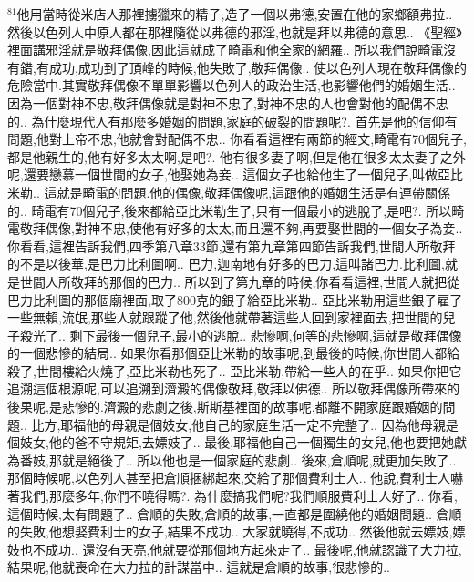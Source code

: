 \documentclass{book}
\begin{document}
$^{81}$他用當時從米店人那裡擄獵來的精子,造了一個以弗德,安置在他的家鄉額弗拉..
然後以色列人中原人都在那裡隨從以弗德的邪淫,也就是拜以弗德的意思..
《聖經》裡面講邪淫就是敬拜偶像,因此這就成了畸電和他全家的網羅..
所以我們說畸電沒有錯,有成功,成功到了頂峰的時候,他失敗了,敬拜偶像..
使以色列人現在敬拜偶像的危險當中.其實敬拜偶像不單單影響以色列人的政治生活,也影響他們的婚姻生活..
因為一個對神不忠,敬拜偶像就是對神不忠了,對神不忠的人也會對他的配偶不忠的..
為什麼現代人有那麼多婚姻的問題,家庭的破裂的問題呢?.
首先是他的信仰有問題,他對上帝不忠,他就會對配偶不忠..
你看看這裡有兩節的經文,畸電有70個兒子,都是他親生的,他有好多太太啊,是吧?.
他有很多妻子啊,但是他在很多太太妻子之外呢,還要戀慕一個世間的女子,他娶她為妾..
這個女子也給他生了一個兒子,叫做亞比米勒..
這就是畸電的問題.他的偶像,敬拜偶像呢,這跟他的婚姻生活是有連帶關係的..
畸電有70個兒子,後來都給亞比米勒生了,只有一個最小的逃脫了,是吧?.
所以畸電敬拜偶像,對神不忠,使他有好多的太太,而且還不夠,再要娶世間的一個女子為妾..
你看看,這裡告訴我們,四季第八章33節,還有第九章第四節告訴我們,世間人所敬拜的不是以後華,是巴力比利圖啊..
巴力,迦南地有好多的巴力,這叫諸巴力.比利圖,就是世間人所敬拜的那個的巴力..
所以到了第九章的時候,你看看這裡,世間人就把從巴力比利圖的那個廟裡面,取了800克的銀子給亞比米勒..
亞比米勒用這些銀子雇了一些無賴,流氓,那些人就跟蹤了他,然後他就帶著這些人回到家裡面去,把世間的兒子殺光了..
剩下最後一個兒子,最小的逃脫..
悲慘啊,何等的悲慘啊,這就是敬拜偶像的一個悲慘的結局..
如果你看那個亞比米勒的故事呢,到最後的時候,你世間人都給殺了,世間樓給火燒了,亞比米勒也死了..
亞比米勒,帶給一些人的在乎..
如果你把它追溯這個根源呢,可以追溯到濟澱的偶像敬拜,敬拜以佛德..
所以敬拜偶像所帶來的後果呢,是悲慘的.濟澱的悲劇之後,斯斯基裡面的故事呢,都離不開家庭跟婚姻的問題..
比方,耶福他的母親是個妓女,他自己的家庭生活一定不完整了..
因為他母親是個妓女,他的爸不守規矩,去嫖妓了..
最後,耶福他自己一個獨生的女兒,他也要把她獻為番妓,那就是絕後了..
所以他也是一個家庭的悲劇..
後來,倉順呢,就更加失敗了..
那個時候呢,以色列人甚至把倉順捆綁起來,交給了那個費利士人..
他說,費利士人嚇著我們,那麼多年,你們不曉得嗎?.
為什麼搞我們呢?我們順服費利士人好了..
你看,這個時候,太有問題了..
倉順的失敗,倉順的故事,一直都是圍繞他的婚姻問題..
倉順的失敗,他想娶費利士的女子,結果不成功..
大家就曉得,不成功..
然後他就去嫖妓,嫖妓也不成功..
還沒有天亮,他就要從那個地方起來走了..
最後呢,他就認識了大力拉,結果呢,他就喪命在大力拉的計謀當中..
這就是倉順的故事,很悲慘的..
\end{document}

